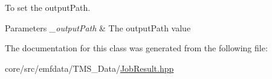 To set the outputPath. 


\begin{DoxyParams}{Parameters}
{\em \_\-outputPath} & The outputPath value \\
\hline
\end{DoxyParams}


The documentation for this class was generated from the following file:\begin{DoxyCompactItemize}
\item 
core/src/emfdata/TMS\_\-Data/\hyperlink{JobResult_8hpp}{JobResult.hpp}\end{DoxyCompactItemize}
